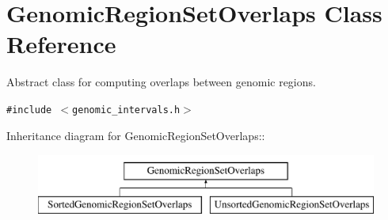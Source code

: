 \hypertarget{classGenomicRegionSetOverlaps}{
\section{GenomicRegionSetOverlaps Class Reference}
\label{classGenomicRegionSetOverlaps}
}
Abstract class for computing overlaps between genomic regions.  


{\tt \#include $<$genomic\_\-intervals.h$>$}

Inheritance diagram for GenomicRegionSetOverlaps::\begin{figure}[H]
\begin{center}
\leavevmode
\includegraphics[height=2cm]{classGenomicRegionSetOverlaps}
\end{center}
\end{figure}
